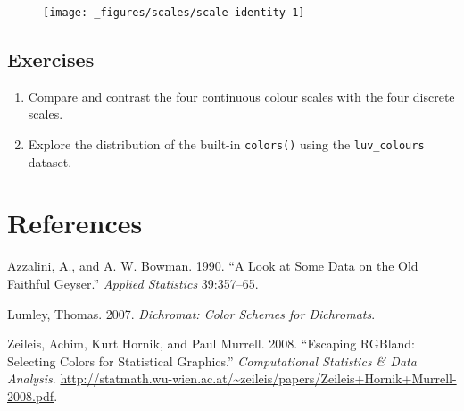 \begin{Shaded}
\begin{Highlighting}[]

\OperatorTok{+}\StringTok{ }
\StringTok{  }\NormalTok{(}\NormalTok{(} \NormalTok{) }\OperatorTok{+}\StringTok{ }
\StringTok{  }\NormalTok{() }\OperatorTok{+}\StringTok{ }
\StringTok{  }\NormalTok{()}
\end{Highlighting}
\end{Shaded}

\begin{figure}[H]
  \centering
  \texttt{[image: \_figures/scales/scale-identity-1]}
\end{figure}

\hypertarget{exercises-4}{%
\subsection{Exercises}\label{exercises-4}}

\begin{enumerate}
\def\labelenumi{\arabic{enumi}.}
\item
  Compare and contrast the four continuous colour scales with the four
  discrete scales.
\item
  Explore the distribution of the built-in \texttt{colors()} using the
  \texttt{luv\_colours} dataset.
\end{enumerate}

\hypertarget{references}{%
\section*{References}\label{references}}

\hypertarget{refs}{}
\leavevmode\hypertarget{ref-azzalini:1990}{}%
Azzalini, A., and A. W. Bowman. 1990. ``A Look at Some Data on the Old
Faithful Geyser.'' \emph{Applied Statistics} 39:357--65.

\leavevmode\hypertarget{ref-dichromat}{}%
Lumley, Thomas. 2007. \emph{Dichromat: Color Schemes for Dichromats}.

\leavevmode\hypertarget{ref-zeileis:2008}{}%
Zeileis, Achim, Kurt Hornik, and Paul Murrell. 2008. ``Escaping RGBland:
Selecting Colors for Statistical Graphics.'' \emph{Computational
Statistics \& Data Analysis}.
\url{http://statmath.wu-wien.ac.at/~zeileis/papers/Zeileis+Hornik+Murrell-2008.pdf}.
